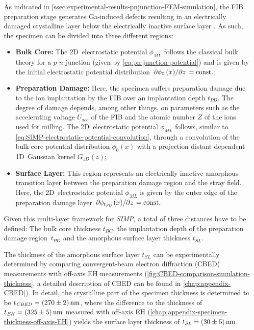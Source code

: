As indicated in \cref{ssec:experimental-results-pnjunction-FEM-simulation}, the FIB preparation stage generates Ga-induced defects resulting in an electrically damaged crystalline layer below the electrically inactive surface layer \cite{Twitchett2002,Beleggia2003,Cooper2006,Cooper2007,Twitchett-Harrison2007,Cooper2009,Somodi2013,Yazdi2015}. As such, the specimen can be divided into three different regions:
\begin{itemize}
	\item \textbf{Bulk Core:} The 2D~electrostatic potential $\phi_{\mathit{ML}}$ follows the classical bulk theory for a $p$-$n$-junction (given by \cref{eq:pn-junction-potential}) and is given by the initial electrostatic potential distribution $\pdv*{\phi_0\left(x\right)}{z} = \text{const.}$;
	\item \textbf{Preparation Damage:} Here, the specimen suffers preparation damage due to the ion implantation by the FIB over an implantation depth $t_{\mathit{PD}}$. The degree of damage depends, among other things, on parameters such as the accelerating voltage $U_{\mathit{acc}}$ of the FIB and the atomic number $Z$ of the ions used for milling. The 2D~electrostatic potential $\phi_{\mathit{ML}}$ follows, similar to \cref{eq:SIMP-electrostatic-potential-convolution}, through a convolution of the bulk core potential distribution $\phi_0\left(x\right)$ with a projection distant dependent 1D~Gaussian kernel $G_{\mathit{1D}}\left(z\right)$;
	\item \textbf{Surface Layer:} This region represents an electrically inactive amorphous transition layer between the preparation damage region and the stray field. Here, the 2D~electrostatic potential $\phi_{\mathit{ML}}$ is given by the outer edge of the preparation damage layer $\pdv*{\phi_{t_{\mathit{PD}}}\left(x\right)}{z} = \text{const.}$
\end{itemize}
Given this multi-layer framework for \emph{SIMP}, a total of three distances have to be defined: The bulk core thickness $t_{\mathit{BC}}$, the implantation depth of the preparation damage region~$t_{\mathit{PD}}$ and the amorphous surface layer thickness $t_{\mathit{SL}}$.

The thickness of the amorphous surface layer $t_{\mathit{SL}}$ can be experimentally determined by comparing convergent-beam electron diffraction (CBED) measurements with off-axis EH measurements (\cref{fig:CBED-comparison-simulation-thickness}, a detailed description of CBED can be found in \cref{chap:appendix-CBED}). In detail, the crystalline part of the specimen thickness is determined to be $t_{\mathit{CBED}} = \SI{270 \pm 2}{\nm}$, where the difference to the thickness of $t_{\mathit{EH}} = \SI{325 \pm 5}{\nm}$ measured with off-axis EH (\cref{chap:appendix-specimen-thickness-off-axis-EH}) yields the surface layer thickness of $t_{\mathit{SL}} = \SI{30 \pm 5}{\nm}$.

